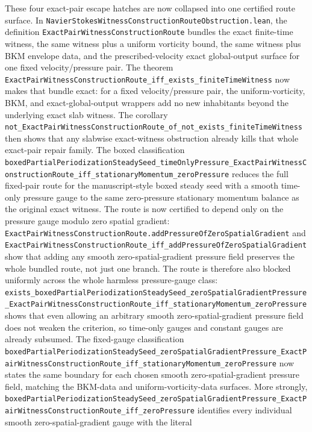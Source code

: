 \documentclass[11pt]{article}
\theoremstyle{remark}
\begin{document}
These four exact-pair escape hatches are now collapsed into one certified route
surface.  In
\texttt{NavierStokesWitnessConstructionRouteObstruction.lean}, the definition
\texttt{ExactPairWitnessConstructionRoute} bundles the exact finite-time
witness, the same witness plus a uniform vorticity bound, the same witness plus
BKM envelope data, and the prescribed-velocity exact global-output surface for
one fixed velocity/pressure pair.  The theorem
\texttt{ExactPairWitnessConstructionRoute\_iff\_exists\_finiteTimeWitness}
now makes that bundle exact: for a fixed velocity/pressure pair, the
uniform-vorticity, BKM, and exact-global-output wrappers add no new inhabitants
beyond the underlying exact slab witness.  The corollary
\texttt{not\_ExactPairWitnessConstructionRoute\_of\_not\_exists\_finiteTimeWitness}
then shows that any slabwise exact-witness obstruction already kills that whole
exact-pair repair family.  The boxed classification
\texttt{boxedPartialPeriodizationSteadySeed\_timeOnlyPressure\_ExactPairWitnessConstructionRoute\_iff\_stationaryMomentum\_zeroPressure}
reduces the full fixed-pair route for the manuscript-style boxed steady seed
with a smooth time-only pressure gauge to the same zero-pressure stationary
momentum balance as the original exact witness.  The route is now certified to
depend only on the pressure gauge modulo zero spatial gradient:
\texttt{ExactPairWitnessConstructionRoute.addPressureOfZeroSpatialGradient}
and
\texttt{ExactPairWitnessConstructionRoute\_iff\_addPressureOfZeroSpatialGradient}
show that adding any smooth zero-spatial-gradient pressure field preserves the
whole bundled route, not just one branch.  The route is therefore also blocked
uniformly across the whole harmless pressure-gauge class:
\texttt{exists\_boxedPartialPeriodizationSteadySeed\_zeroSpatialGradientPressure\_ExactPairWitnessConstructionRoute\_iff\_stationaryMomentum\_zeroPressure}
shows that even allowing an arbitrary smooth zero-spatial-gradient pressure
field does not weaken the criterion, so time-only gauges and constant gauges are
already subsumed.  The fixed-gauge classification
\texttt{boxedPartialPeriodizationSteadySeed\_zeroSpatialGradientPressure\_ExactPairWitnessConstructionRoute\_iff\_stationaryMomentum\_zeroPressure}
now states the same boundary for each chosen smooth zero-spatial-gradient
pressure field, matching the BKM-data and uniform-vorticity-data surfaces.
More strongly,
\texttt{boxedPartialPeriodizationSteadySeed\_zeroSpatialGradientPressure\_ExactPairWitnessConstructionRoute\_iff\_zeroPressure}
identifies every individual smooth zero-spatial-gradient gauge with the literal
\end{document}
